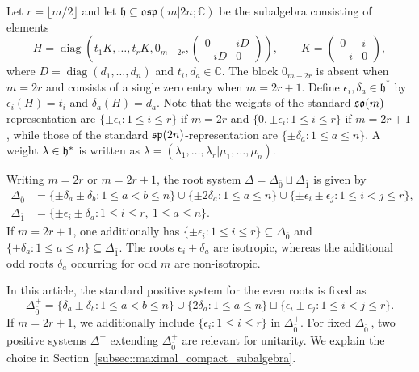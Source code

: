 Let $r=\lfloor m/2\rfloor$ and let $\mathfrak h\subseteq\mathfrak{osp}(m\vert 2n;\mathbb C)$ be the subalgebra consisting of elements
\begin{equation}
H=\operatorname{diag}\left(
t_1K,\ldots,t_rK,0_{m-2r},
\begin{pmatrix}
0&iD\\
-iD&0
\end{pmatrix}
\right),
\qquad
K=\begin{pmatrix}
0&i\\
-i&0
\end{pmatrix},
\end{equation}
where $D=\operatorname{diag}(d_1,\ldots,d_n)$ and $t_i,d_a\in\mathbb C$. The block $0_{m-2r}$ is absent when $m=2r$ and consists of a single zero entry when $m=2r+1$. Define $\epsilon_i,\delta_a\in\mathfrak h^*$ by $\epsilon_i(H)=t_i$ and $\delta_a(H)=d_a$. Note that the weights of the standard $\so(m)$-representation are $\{\pm\epsilon_i:1\leq i\leq r\}$ if $m=2r$ and $\{0,\pm\epsilon_i:1\leq i\leq r\}$ if $m=2r+1$, while those of the standard $\sp(2n)$-representation are $\{\pm\delta_a:1\leq a\leq n\}$. A weight $\lambda\in\hh^{\ast}$ is written as $\lambda=(\lambda_1,\ldots,\lambda_r\vert\mu_1,\ldots,\mu_n)$.

Writing $m=2r$ or $m=2r+1$, the root system $\Delta=\Delta_{\bar0}\sqcup\Delta_{\bar1}$ is given by
\begin{equation}
\begin{aligned}
\Delta_{\bar0}
&=
\{\pm\delta_a\pm\delta_b:1\leq a<b\leq n\}
\cup\{\pm2\delta_a:1\leq a\leq n\}
\cup\{\pm\epsilon_i\pm\epsilon_j:1\leq i<j\leq r\},\\
\Delta_{\bar1}
&=
\{\pm\epsilon_i\pm\delta_a:1\leq i\leq r,\ 1\leq a\leq n\}.
\end{aligned}
\label{eq:osp-roots}
\end{equation}
If $m=2r+1$, one additionally has $\{\pm\epsilon_i:1\leq i\leq r\}\subseteq\Delta_{\bar0}$ and $\{\pm\delta_a:1\leq a\leq n\}\subseteq\Delta_{\bar1}$. The roots $\epsilon_i\pm\delta_a$ are isotropic, whereas the additional odd roots $\delta_a$ occurring for odd $m$ are non-isotropic.

In this article, the standard positive system for the even roots is fixed as
\begin{equation}
\Delta_{\bar0}^+
=
\{\delta_a\pm\delta_b:1\leq a<b\leq n\}
\cup\{2\delta_a:1\leq a\leq n\}
\sqcup
\{\epsilon_i\pm\epsilon_j:1\leq i<j\leq r\}.
\label{eq:osp-positive-even-roots}
\end{equation}
If $m=2r+1$, we additionally include $\{\epsilon_i:1\leq i\leq r\}$ in $\Delta_{\bar0}^+$. For fixed $\Delta_{\bar{0}}^{+}$, two positive systems $\Delta^{+}$ extending $\Delta_{\bar{0}}^{+}$ are relevant for unitarity. We explain the choice in Section~\ref{subsec::maximal_compact_subalgebra}.


